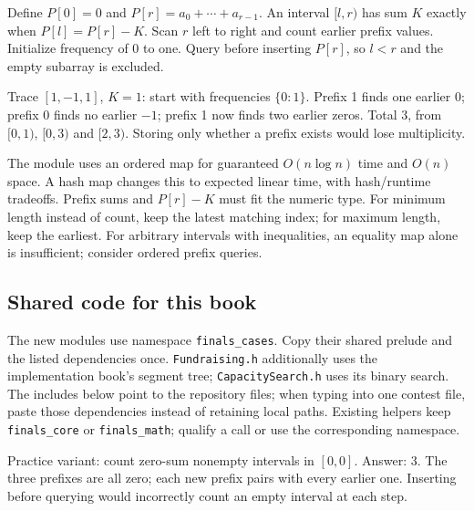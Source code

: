 Define $P[0]=0$ and $P[r]=a_0+\cdots+a_{r-1}$. An interval $[l,r)$ has
sum $K$ exactly when $P[l]=P[r]-K$. Scan $r$ left to right and count earlier
prefix values. Initialize frequency of 0 to one. Query before inserting
$P[r]$, so $l<r$ and the empty subarray is excluded.

Trace $[1,-1,1]$, $K=1$: start with frequencies $\{0:1\}$. Prefix 1 finds
one earlier 0; prefix 0 finds no earlier $-1$; prefix 1 now finds two earlier
zeros. Total 3, from $[0,1)$, $[0,3)$ and $[2,3)$. Storing only whether a
prefix exists would lose multiplicity.

The module uses an ordered map for guaranteed $O(n\log n)$ time and $O(n)$
space. A hash map changes this to expected linear time, with hash/runtime
tradeoffs. Prefix sums and $P[r]-K$ must fit the numeric type. For minimum
length instead of count, keep the latest matching index; for maximum length,
keep the earliest. For arbitrary intervals with inequalities, an equality
map alone is insufficient; consider ordered prefix queries.

\subsection{Shared code for this book}
The new modules use namespace \texttt{finals\_cases}. Copy their shared
prelude and the listed dependencies once. \texttt{Fundraising.h} additionally
uses the implementation book's segment tree; \texttt{CapacitySearch.h} uses
its binary search. The includes below point to the repository files; when
typing into one contest file, paste those dependencies instead of retaining
local paths. Existing helpers keep \texttt{finals\_core} or
\texttt{finals\_math}; qualify a call or use the corresponding namespace.

Practice variant: count zero-sum nonempty intervals in $[0,0]$. Answer: 3.
The three prefixes are all zero; each new prefix pairs with every earlier
one. Inserting before querying would incorrectly count an empty interval
at each step.
